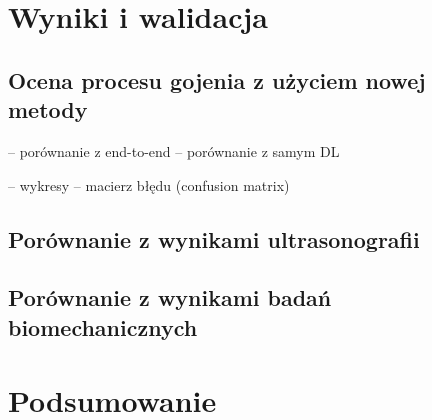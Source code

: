 \chapter{Wyniki i walidacja}


\section{Ocena procesu gojenia z użyciem nowej metody}

-- porównanie z end-to-end
-- porównanie z samym DL



-- wykresy
-- macierz błędu (confusion matrix)


\section{Porównanie z wynikami ultrasonografii}
\section{Porównanie z wynikami badań biomechanicznych}


\chapter{Podsumowanie}


